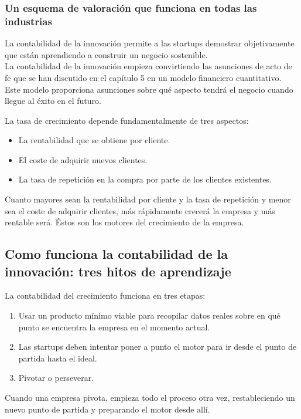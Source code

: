 \documentclass[10pt]{article}
\begin{document}
\begin{multicols}{2}
\subsubsection*{Un esquema de valoración que funciona en todas las industrias}
{\color{blue} La contabilidad de la innovación permite a las startups demostrar objetivamente que están aprendiendo a construir un negocio sostenible.}\\
La contabilidad de la innovación empieza convirtiendo las asunciones de acto de fe que se han discutido en el capítulo 5 en un modelo financiero cuantitativo. \\
Este modelo proporciona asunciones sobre qué aspecto tendrá el negocio cuando llegue al éxito en el futuro.\\
{\color{blue} La tasa de crecimiento depende fundamentalmente de tres aspectos:
\begin{itemize}
\item La rentabilidad que se obtiene por cliente.
\item El coste de adquirir nuevos clientes.
\item La tasa de repetición en la compra por parte de los clientes existentes.
\end{itemize}}
Cuanto mayores sean la rentabilidad por cliente y la tasa de repetición y menor sea el coste de adquirir clientes, más rápidamente crecerá la empresa y más rentable será. Éstos son los motores del crecimiento de la empresa.
\subsection*{Como funciona la contabilidad de la innovación: tres hitos de aprendizaje}
{\color{blue}La contabilidad del crecimiento funciona en tres etapas:
\begin{enumerate}
\item Usar un producto mínimo viable para recopilar datos reales sobre en qué punto se encuentra la empresa en el momento actual.
\item Las startups deben intentar poner a punto el motor para ir desde el punto de partida hasta el ideal.
\item Pivotar o perseverar.
\end{enumerate}}
Cuando una empresa pivota, empieza todo el proceso otra vez, restableciendo un nuevo punto de partida y preparando el motor desde allí.

\end{multicols}
\end{document}
